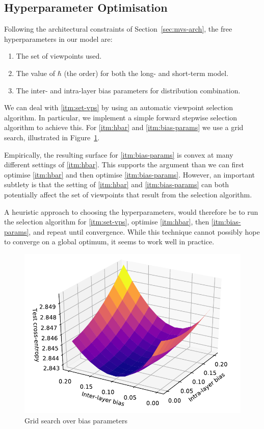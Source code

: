 \documentclass[12pt,a4paper,twoside,openright]{report}
\begin{document}
\subsection{Hyperparameter Optimisation}

Following the architectural constraints of Section~\ref{sec:mvs-arch}, the
free hyperparameters in our model are:
\begin{enumerate}[label=(\arabic*), itemsep=0mm]
  \item The set of viewpoints used. \label{itm:set-vps}
  \item The value of $\hbar$ (the order) for both the long- and short-term
    model. \label{itm:hbar}
  \item The inter- and intra-layer bias parameters for distribution combination.
    \label{itm:bias-params}
\end{enumerate}

We can deal with \ref{itm:set-vps} by using an automatic viewpoint selection
algorithm. In particular, we implement a simple forward stepwise selection
algorithm to achieve this. For \ref{itm:hbar} and \ref{itm:bias-params} we use a
grid search, illustrated in Figure~\ref{fig:grid-search}. 

Empirically, the resulting surface for \ref{itm:bias-params} is convex at many
different settings of \ref{itm:hbar}. This supports the argument than we can
first optimise \ref{itm:hbar} and then optimise \ref{itm:bias-params}. However,
an important subtlety is that the setting of \ref{itm:hbar} and
\ref{itm:bias-params} can both potentially affect the set of viewpoints that
result from the selection algorithm.

A heuristic approach to choosing the hyperparameters, would therefore be to run
the selection algorithm for \ref{itm:set-vps}, optimise \ref{itm:hbar}, then
\ref{itm:bias-params}, and repeat until convergence. While this technique cannot
possibly hope to converge on a global optimum, it seems to work well in
practice.

\begin{figure}[H]
\centering
\includegraphics[width=350pt]{figs/bias_plot.pdf}
\caption{Grid search over bias parameters}
\label{fig:grid-search}
\end{figure}
\end{document}
